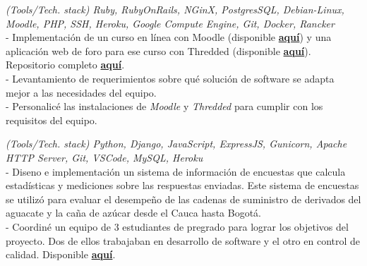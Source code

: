 \documentclass[]{CV-JuanCamiloFlorez}
\begin{document}
\begin{minipage}[t]{0.66\textwidth}
    \noindent
    \focusareas{}
    \textit{(Tools/Tech. stack) Ruby, RubyOnRails, NGinX, PostgresSQL, Debian-Linux, Moodle, PHP, SSH, Heroku, Google Compute Engine, Git, Docker, Rancker} \\
        - Implementación de un curso en línea con Moodle (disponible \textbf{\href{https://gitlab.com/VanJFlorez/animal-modeling-ethics/tree/master/docs/4 LMS build}{aquí}}) y una aplicación web de foro para ese curso con Thredded (disponible \textbf{\href{https://gitlab.com/VanJFlorez/animal-modeling-ethics/blob/master/docs/3\%20Social\%20WebApp/CP\%20etica\%20animal\%20webApp.pdf}{aquí}}). Repositorio completo \textbf{\href{https://gitlab.com/VanJFlorez/animal-modeling-ethics/}{aquí}}. \\
        - Levantamiento de requerimientos sobre qué solución de software se adapta mejor a las necesidades del equipo. \\
        - Personalicé las instalaciones de \textit{Moodle} y \textit{Thredded} para cumplir con los requisitos del equipo. \\
        \sectionsep

    \noindent
    \focusareas{}
    \textit{(Tools/Tech. stack) Python, Django, JavaScript, ExpressJS, Gunicorn, Apache HTTP Server, Git, VSCode, MySQL, Heroku} \\
        - Diseno e implementación un sistema de información de encuestas que calcula estadísticas y mediciones sobre las respuestas enviadas. Este sistema de encuestas se utilizó para evaluar el desempeño de las cadenas de suministro de derivados del aguacate y la caña de azúcar desde el Cauca hasta Bogotá. \\
        - Coordiné un equipo de 3 estudiantes de pregrado para lograr los objetivos del proyecto. Dos de ellos trabajaban en desarrollo de software y el otro en control de calidad. Disponible \textbf{\href{https://gitlab.com/VanJFlorez/sepro-webapp}{aquí}}. \\
        \sectionsep

 
\vspace{\topsep} %



\end{minipage}
\end{document}
